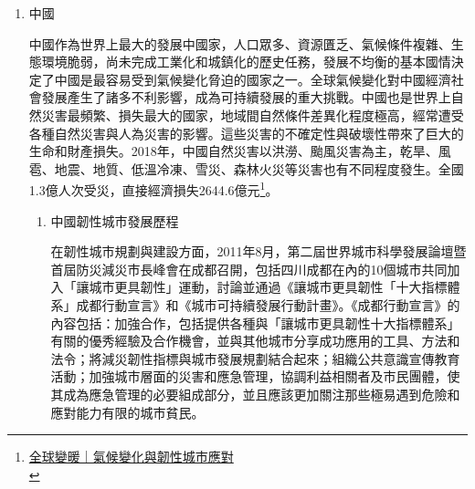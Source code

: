 \documentclass[a4paper,12pt]{article}
\begin{document}
\begin{enumerate}
\begin{enumerate}
位於加塞走廊.與埃及相隔一個西奈半島的以色列自立國以來，就因降水少沙漠多而缺乏淡水，但此危機卻發展出全球頂尖的水資源管理能力。以色列水務總局局長Giora Shaham說明，以色列八七○萬人口加上農工業，每年短缺二十一億立方的淡水，而氣候變遷使以色列乾旱越來越嚴重，同時可能伴隨水患。因此以色列在各地水源建立觀測模型，預測自然供水變化，每年二次委員會依據預測水量來討論各方用水的平衡\footnote{\href{https://www.cw.com.tw/article/5090081?from=search}{氣候變遷下的缺水挑戰，地球村的居民，你準備好了嗎？}\\\label{org188d195}}。\\

另一方面也設法將用水來源多元化，至2018年，以色列有五座回收廢水處理廠，重覆利用八十六\%的水，全國用水有一半由海水淡化與回收水而來，降低對自然供水的依賴。除了科技與設備，以色列同時在法規及組織管理、水質標準及財務規範上著力，結合經濟政策，建立更有效率的水資源管理\textsuperscript{\ref{org188d195}}。\\
\end{enumerate}
\item 中國
\label{sec:orga208218}

中國作為世界上最大的發展中國家，人口眾多、資源匱乏、氣候條件複雜、生態環境脆弱，尚未完成工業化和城鎮化的歷史任務，發展不均衡的基本國情決定了中國是最容易受到氣候變化脅迫的國家之一。全球氣候變化對中國經濟社會發展產生了諸多不利影響，成為可持續發展的重大挑戰。中國也是世界上自然災害最頻繁、損失最大的國家，地域間自然條件差異化程度極高，經常遭受各種自然災害與人為災害的影響。這些災害的不確定性與破壞性帶來了巨大的生命和財產損失。2018年，中國自然災害以洪澇、颱風災害為主，乾旱、風雹、地震、地質、低溫冷凍、雪災、森林火災等災害也有不同程度發生。全國1.3億人次受災，直接經濟損失2644.6億元\footnote{\href{http://m.tanpaifang.com/article/72587.html}{全球變暖｜氣候變化與韌性城市應對}\\\label{org70a59c2}}。\\

\begin{enumerate}
\item 中國韌性城市發展歷程
\label{sec:org907041c}

在韌性城市規劃與建設方面，2011年8月，第二屆世界城市科學發展論壇暨首屆防災減災市長峰會在成都召開，包括四川成都在內的10個城市共同加入「讓城市更具韌性」運動，討論並通過《讓城市更具韌性「十大指標體系」成都行動宣言》和《城市可持續發展行動計畫》。《成都行動宣言》的內容包括：加強合作，包括提供各種與「讓城市更具韌性十大指標體系」有關的優秀經驗及合作機會，並與其他城市分享成功應用的工具、方法和法令；將減災韌性指標與城市發展規劃結合起來；組織公共意識宣傳教育活動；加強城市層面的災害和應急管理，協調利益相關者及市民團體，使其成為應急管理的必要組成部分，並且應該更加關注那些極易遇到危險和應對能力有限的城市貧民。\\


\end{enumerate}
\end{enumerate}
\end{document}
